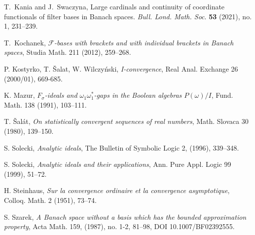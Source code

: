 \documentclass{amsart}
\begin{document}
\begin{thebibliography}{}
 T.~Kania and J.~Swaczyna, Large cardinals and continuity of coordinate functionals of filter bases in Banach spaces. \emph{Bull. Lond. Math. Soc}. \textbf{53} (2021), no. 1, 231--239.

 T.~Kochanek, \emph{$\mathcal F$-bases with brackets and with individual brackets in Banach spaces}, Studia Math. 211 (2012), 259--268.

 P. Kostyrko, T. \v{S}alat, W. Wilczy\'nski, \emph{I-convergence}, Real Anal. Exchange 26 (2000/01), 669-685.

 K. Mazur, \emph{{$F_\sigma$}-ideals and {$\omega_1\omega_1^*$}-gaps in the {B}oolean algebras {$P(\omega)/I$}}, Fund. Math. 138 (1991), 103--111.

T. \v{S}al\'{a}t, 
\emph{On statistically convergent sequences of real numbers}, 
Math. Slovaca 30 (1980), 139--150.

 S. Solecki, \emph{Analytic ideals}, The Bulletin of Symbolic Logic 2, (1996), 339--348.

 S. Solecki, \emph{Analytic ideals and their applications}, Ann. Pure Appl. Logic 99 (1999), 51--72.

H. Steinhaus, 
\emph{Sur la convergence ordinaire et la convergence asymptotique}, 
Colloq. Math. 2 (1951), 73--74.

 S. Szarek, \emph{A Banach space without a basis which has the bounded approximation
property}, Acta Math. 159, (1987), no. 1-2, 81–98, DOI 10.1007/BF02392555.


\end{thebibliography}
\end{document}
